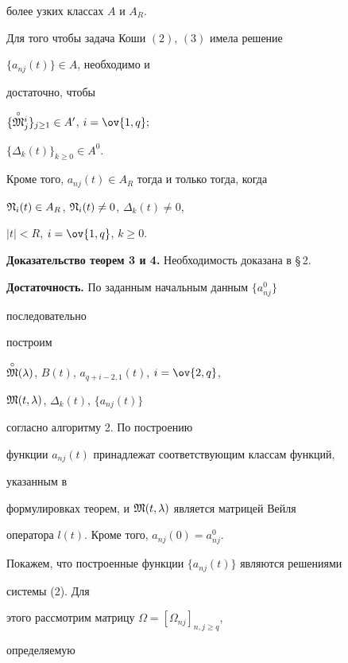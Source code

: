 более узких классах $A$ и $A_R$. 


 


\begin{thm} 


Для того чтобы задача Коши $(2)$, $(3)$ имела решение 


$\{a_{nj}(t)\}\in A$, необходимо и 


достаточно, чтобы 


$\{\overset{\circ}{\frak M}{}^i_j\}_{j\ge 1}\in A'$, $i=\ov{1,q};$ 


$\{\Delta_k(t)\}_{k\ge 0}\in A^0$. 


Кроме того, $a_{nj}(t)\in A_R$ тогда и только тогда, когда 


$\frak N_i(t)\in A_R$, $\frak N_i(t)\ne 0$, $\Delta_k(t)\ne 0$, 


$|t|<R$, $i=\ov{1,q}$, $k\ge 0$. 


\end{thm} 


 


{\bf Доказательство теорем 3 и 4.} Необходимость доказана в \S\,2. 


 


{\bf Достаточность.} По заданным начальным данным $\{a^0_{nj}\}$ 


последовательно 


построим 


$\overset{\circ}{\frak M}{}(\lambda)$, $B(t)$, $a_{q+i-2,1}(t)$, $i=\ov{2,q}$, 


$\frak M(t,\lambda)$, $\Delta_k(t)$, $\{a_{nj}(t)\}$ 


согласно алгоритму 2. По построению 


функции $a_{nj}(t)$ принадлежат соответствующим классам функций, 


указанным в 


формулировках теорем, и $\frak M(t,\lambda)$ является матрицей Вейля 


оператора $l(t)$. Кроме того, $a_{nj}(0)=a^0_{nj}$. 


 


Покажем, что построенные функции $\{a_{nj}(t)\}$ являются решениями 


системы (2). Для 


этого рассмотрим матрицу $\Omega=[\Omega_{nj}]_{n,j\ge q}$, 


определяемую 


